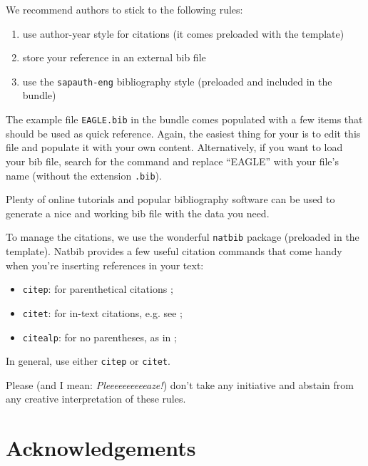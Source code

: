 \documentclass[amsthm,ebook]{saparticle}
\begin{document}
We recommend authors to stick to the following rules:
\begin{enumerate}
\item use author-year style for citations (it comes preloaded with the template)
\item store your reference in an external bib file
\item use the \texttt{sapauth-eng} bibliography style (preloaded and included in the bundle)
\end{enumerate}

The example file \texttt{EAGLE.bib} in the bundle comes populated with a few items that should be used as quick reference. Again, the easiest thing for your is to edit this file and populate it with your own content. Alternatively, if you want to load your bib file, search for the command \verb!! and replace ``EAGLE'' with your file's name (without the extension \texttt{.bib}).

Plenty of online tutorials and popular bibliography software can be used to generate a nice and working bib file with the data you need.

To manage the citations, we use the wonderful \texttt{natbib} package (preloaded in the template). Natbib provides a few useful citation commands that come handy when you're inserting references in your text:
\begin{itemize}
\item \texttt{citep}: for parenthetical citations  \citep[e.g.][1-100]{bringhurst:2002};
\item \texttt{citet}: for in-text citations, e.g. see \citet[1-100]{bringhurst:2002};
\item \texttt{citealp}: for no parentheses, as in \citealp[1-100]{bringhurst:2002};
\end{itemize}

In general, use either \texttt{citep} or \texttt{citet}.

Please (and I mean: \emph{Pleeeeeeeeeeaze!}) don't take any initiative and abstain from any creative interpretation of these rules.

\nocite{Ruiz,bodard2008,bringhurst:2002,Doerr2003,Gernet:1932lr,Goldhill:1997dn,Knuth:1986aa,Lloyd-Jones:1997fk,Sbisa:1978gb,Denniston:1954lr,Longo:1990or}

\section*{Acknowledgements}
\end{document}

